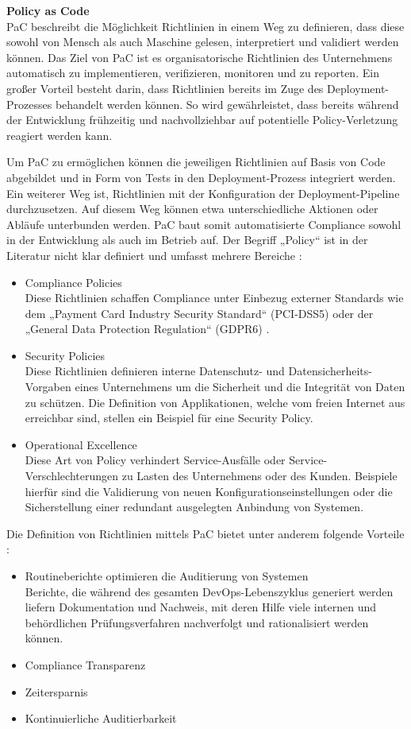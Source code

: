 \bigbreak
\textbf{Policy as Code}\\
PaC beschreibt die Möglichkeit Richtlinien in einem Weg zu definieren, dass diese sowohl von Mensch als auch Maschine gelesen, interpretiert und validiert werden können.
Das Ziel von PaC ist es organisatorische Richtlinien des Unternehmens automatisch zu implementieren, verifizieren, monitoren und zu reporten. Ein großer Vorteil besteht darin, dass Richtlinien bereits im Zuge des Deployment-Prozesses behandelt werden können. So wird gewährleistet, dass bereits während der Entwicklung frühzeitig und nachvollziehbar auf potentielle Policy-Verletzung reagiert werden kann.

Um PaC zu ermöglichen können die jeweiligen Richtlinien auf Basis von Code abgebildet und in Form von Tests in den Deployment-Prozess integriert werden. Ein weiterer Weg ist, Richtlinien mit der Konfiguration der Deployment-Pipeline durchzusetzen. Auf diesem Weg können etwa unterschiedliche Aktionen oder Abläufe unterbunden werden. PaC baut somit automatisierte Compliance sowohl in der Entwicklung als auch im Betrieb auf.
Der Begriff „Policy“ ist in der Literatur nicht klar definiert und umfasst mehrere Bereiche \autocite{dadgar}:
\begin{itemize}
    \item Compliance Policies\\
    Diese Richtlinien schaffen Compliance unter Einbezug externer Standards wie
    dem „Payment Card Industry Security Standard“ (PCI-DSS5) oder der „General Data Protection Regulation“ (GDPR6) \autocite{PCIDSS5} \autocite{GDPR}.
    \item Security Policies\\
    Diese Richtlinien definieren interne Datenschutz- und Datensicherheits-Vorgaben eines Unternehmens um die Sicherheit und die Integrität von Daten zu schützen. Die Definition von Applikationen, welche vom freien Internet aus erreichbar sind, stellen ein Beispiel für eine Security Policy.
    \item Operational Excellence\\
    Diese Art von Policy verhindert Service-Ausfälle oder Service-Verschlechterungen zu Lasten des Unternehmens oder des Kunden. Beispiele hierfür sind die Validierung von neuen Konfigurationseinstellungen oder die Sicherstellung einer redundant ausgelegten Anbindung von Systemen.
\end{itemize}
\bigbreak
Die Definition von Richtlinien mittels PaC bietet unter anderem folgende Vorteile \autocite{hackernoon_2020}:
\begin{itemize}
    \item Routineberichte optimieren die Auditierung von Systemen\\
    Berichte, die während des gesamten DevOps-Lebenszyklus generiert werden liefern Dokumentation und Nachweis, mit deren Hilfe viele internen und behördlichen Prüfungsverfahren nachverfolgt und rationalisiert werden können.
    \item Compliance Transparenz
    \item Zeitersparnis
    \item Kontinuierliche Auditierbarkeit
\end{itemize}

